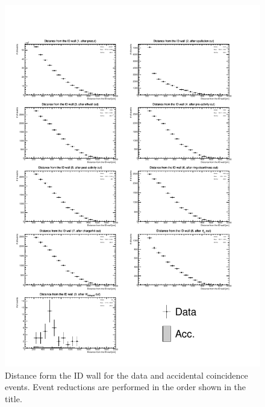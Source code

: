 \begin{figure}[h]
	\centering
	\includegraphics[width=15cm]{PDF/Dist_Data/Che_50deg_tag_ge1/dwall}
	\caption[Distance from the ID wall for the data and accidental coincidence events]{
	Distance form the ID wall for the data and accidental coincidence events.
	Event reductions are performed in the order shown in the title.
	}\label{Data_dwall}
\end{figure}


